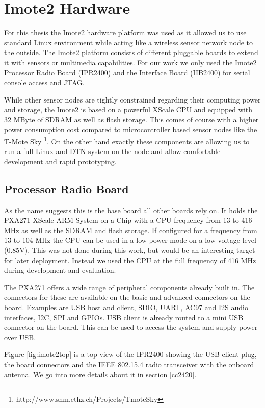 \chapter{Imote2 Hardware}
For this thesis the Imote2 \cite{imote2} hardware platform was used as it allowed us to use
standard Linux environment while acting like a wireless sensor network node to
the outside. The Imote2 platform
consists of different pluggable boards to extend it with sensors or multimedia
capabilities. For our work we only used the Imote2 Processor Radio Board
(IPR2400) and the Interface Board (IIB2400) for serial console access and JTAG.

While other sensor nodes are tightly constrained regarding their computing power
and storage, the Imote2 is based on a powerful XScale CPU and equipped with 32
MByte of SDRAM as well as flash storage. This comes of course with a higher power
consumption cost compared to microcontroller based sensor nodes like the T-Mote
Sky \footnote{http://www.snm.ethz.ch/Projects/TmoteSky}. On the other hand
exactly these components are allowing us to run a full
Linux and DTN system on the node and allow comfortable development and rapid
prototyping.

\section{Processor Radio Board}
As the name suggests this is the base board all other boards rely on. It holds
the PXA271 XScale ARM System on a Chip with a CPU frequency from 13 to 416 MHz
as well as the SDRAM and flash storage. If configured for a frequency from 13
to 104 MHz the CPU can be used in a low power mode on a low voltage level
(0.85V). This was not done during this work, but would be an interesting target
for later deployment. Instead we used the CPU at the full frequency of 416 MHz
during development and evaluation.

The PXA271 offers a wide range of peripheral components already built in. The
connectors for these are available on the basic and advanced connectors on the
board. Examples are USB host and client, SDIO, UART, AC97 and I2S audio
interfaces, I2C, SPI and GPIOs. USB client is already routed to a mini USB
connector on the board. This can be used to access the system and supply power
over USB.

Figure \ref{fig:imote2top} is a top view of the IPR2400 showing the USB client plug,
the board connectors and the IEEE 802.15.4 radio transceiver with the onboard
antenna. We go into more details about it in section \ref{cc2420}.


